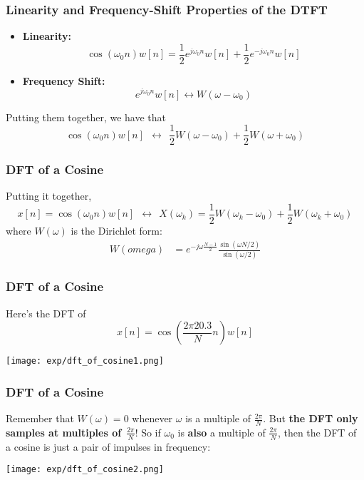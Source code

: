 \documentclass{beamer}
\begin{document}
\begin{frame}
  \frametitle{Linearity and Frequency-Shift Properties of the DTFT}

  \begin{itemize}
  \item {\bf Linearity:}
    \begin{displaymath}
      \cos(\omega_0 n)w[n] = \frac{1}{2}e^{j\omega_0 n}w[n] + \frac{1}{2}e^{-j\omega_0 n}w[n]
    \end{displaymath}
  \item {\bf Frequency Shift:}
    \begin{displaymath}
      e^{j\omega_0 n}w[n] \leftrightarrow W(\omega-\omega_0)
    \end{displaymath}
  \end{itemize}
  Putting them together, we have that
  \begin{displaymath}
    \cos(\omega_0 n)w[n]~~\leftrightarrow~~\frac{1}{2}W(\omega-\omega_0) + \frac{1}{2}W(\omega+\omega_0)
  \end{displaymath}
\end{frame}


\begin{frame}
  \frametitle{DFT of a Cosine}

  Putting it together,
  \begin{displaymath}
    x[n]=\cos(\omega_0 n)w[n] ~~\leftrightarrow~~
    X(\omega_k)=\frac{1}{2}W(\omega_k-\omega_0) + \frac{1}{2}W(\omega_k+\omega_0)
  \end{displaymath}
  where $W(\omega)$ is the Dirichlet form:
  \begin{align*}
    W(omega) &= e^{-j\omega\frac{N-1}{2}}\frac{\sin(\omega N/2)}{\sin(\omega/2)}
  \end{align*}
\end{frame}

\begin{frame}
  \frametitle{DFT of a Cosine}

  Here's the DFT of
  \[
  x[n] = \cos\left(\frac{2\pi 20.3}{N}n\right) w[n]
  \]
  
  \centerline{\texttt{[image: exp/dft\_of\_cosine1.png]}}
\end{frame}

\begin{frame}
  \frametitle{DFT of a Cosine}

  Remember that $W(\omega)=0$ whenever $\omega$ is a multiple of
  $\frac{2\pi}{N}$.  But {\bf the DFT only samples at multiples
    of}~$\frac{2\pi}{N}$!  So if $\omega_0$ is {\bf also} a multiple
  of $\frac{2\pi}{N}$, then the DFT of a cosine is just a pair of
  impulses in frequency:
  \centerline{\texttt{[image: exp/dft\_of\_cosine2.png]}}
\end{frame}
\end{document}
